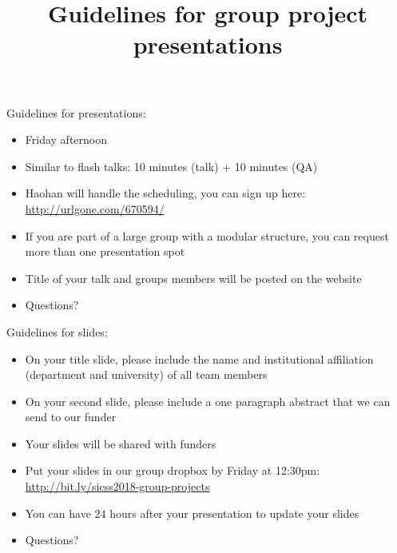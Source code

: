 \documentclass[aspectratio=169]{beamer}
\title[]{Guidelines for group project presentations}
\author[]{}
\date[]{Summer Institute in Computational Social Science\\June 28, 2018
\vfill
\begin{flushleft}
{\scriptsize
The Summer Institute in Computational Social Science is supported by grants from the Russell Sage Foundation and the Alfred P. Sloan Foundation.}
\end{flushleft}
\begin{flushright}
\texttt{[image: figures/cc-by.png]}
\end{flushright}
}
\begin{document}
\frame{\titlepage}
\begin{frame}

Guidelines for presentations:
\begin{itemize}
\item Friday afternoon \pause
\item Similar to flash talks: 10 minutes (talk) + 10 minutes (QA) \pause
\item Haohan will handle the scheduling, you can sign up here: \textcolor{blue}{\url{http://urlgone.com/670594/}} \pause
\item If you are part of a large group with a modular structure, you can request more than one presentation spot \pause
\item Title of your talk and groups members will be posted on the website \pause
\item Questions?
\end{itemize}

\end{frame}
\begin{frame}

Guidelines for slides:
\begin{itemize}
\item On your title slide, please include the name and institutional affiliation (department and university) of all team members \pause
\item On your second slide, please include a one paragraph abstract that we can send to our funder \pause
\item Your slides will be shared with funders \pause
\item Put your slides in our group dropbox by Friday at 12:30pm: \textcolor{blue}{\url{http://bit.ly/sicss2018-group-projects}} \pause
\item You can have 24 hours after your presentation to update your slides \pause
\item Questions?
\end{itemize}

\end{frame}
\end{document}
